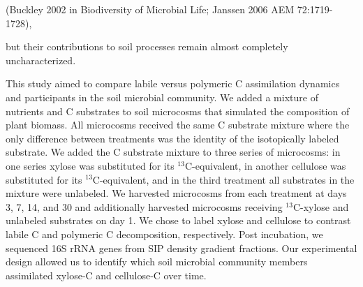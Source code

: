 (Buckley 2002 in Biodiversity of Microbial Life; Janssen 2006 AEM
72:1719-1728), 

but their contributions to soil processes remain almost completely
uncharacterized. 

This study aimed to compare labile versus polymeric C assimilation dynamics and
participants in the soil microbial community. We added a mixture of nutrients
and C substrates to soil microcosms that simulated the composition of plant
biomass. All microcosms received the same C substrate mixture where the only
difference between treatments was the identity of the isotopically labeled
substrate. We added the C substrate mixture to three series of
microcosms: in one series xylose was substituted for its $^{13}$C-equivalent,
in another cellulose was substituted for its $^{13}$C-equivalent, and in the
third treatment all substrates in the mixture were unlabeled. We harvested
microcosms from each treatment at days 3, 7, 14, and 30 and additionally
harvested microcosms receiving $^{13}$C-xylose and unlabeled substrates on day
1. We chose to label xylose and cellulose to contrast labile C and polymeric
C decomposition, respectively. Post incubation, we sequenced 16S rRNA genes
from SIP density gradient fractions. Our experimental design allowed us to
identify which soil microbial community members assimilated xylose-C
and cellulose-C over time.
